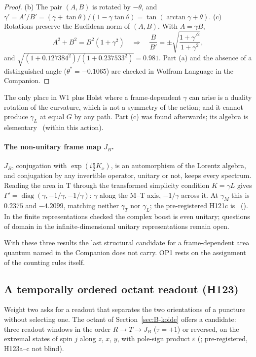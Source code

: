 \begin{proof}
(b) The pair $(A,B)$ is rotated by $-\theta$, and $\gamma'=A'/B'=(\gamma+\tan\theta)/(1-\gamma\tan\theta)=\tan(\arctan\gamma+\theta)$.  (c) Rotations
preserve the Euclidean norm of $(A,B)$.  With $A=\gamma B$,
\[
 A^2+B^2=B^2(1+\gamma^2)\quad\Longrightarrow\quad \frac{B}{B'}=\pm\sqrt{\frac{1+\gamma'^2}{1+\gamma^2}},
\]
and $\sqrt{(1+0.127384^2)/(1+0.237533^2)}=0.981$.  Part (a) and the absence of a distinguished angle ($\theta^*=-0.1065$) are checked in Wolfram
Language in the Companion.
\end{proof}

The only place in W1 plus Holst where a frame-dependent $\gamma$ can arise is a duality rotation of the curvature, which is not a symmetry of the
action; and it cannot produce $\gamma_L$ at equal $G$ by any path.  Part (c) was found afterwards; its algebra is elementary
\Established\ (within this action).

\paragraph{The non-unitary frame map $J_B$.}
$J_B$, conjugation with $\exp(i\tfrac\pi2K_x)$, is an automorphism of the Lorentz algebra, and conjugation by any invertible operator, unitary or not,
keeps every spectrum.  Reading the area in T through the transformed simplicity condition $K=\gamma L$ gives $\Gamma'=\operatorname{diag}(\gamma,-1/\gamma,-1/\gamma)$:
$\gamma$ along the M--T axis, $-1/\gamma$ across it.  At $\gamma_M$ this is $0.2375$ and $-4.2099$, matching neither $\gamma_T$ nor $\gamma_L$; the
pre-registered H121c is \Refuted\ ().  In the finite representations checked the complex boost is even unitary; questions of domain in
the infinite-dimensional unitary representations remain open.

With these three results the last structural candidate for a frame-dependent area quantum named in the Companion does not carry.  OP1 rests on the
assignment of the counting rules itself.

\subsection{A temporally ordered octant readout (H123)}
\label{sec:beta-h123}

Weight two asks for a readout that separates the two orientations of a puncture without selecting one.  The octant of Section~\ref{sec:B-koide} offers a candidate:
three readout windows in the order $R\to T\to J_B$ ($\tau=+1$) or reversed, on the extremal states of spin $j$ along $z$, $x$, $y$, with pole-sign
product $\varepsilon$ (; pre-registered, H123a--c not blind).

